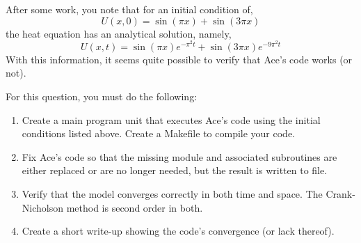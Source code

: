 \documentclass[12pt, letterpaper]{article}
\begin{document}
After some work, you note that for an initial condition of,
\begin{equation}
  U(x,0) = \sin(\pi x) + \sin(3 \pi x)
\end{equation}
the heat equation has an analytical solution, namely,
\begin{equation}
  U(x,t) = \sin(\pi x)e^{-\pi^2t}+\sin(3\pi x)e^{-9\pi^2t}
\end{equation}
With this information, it seems quite possible to verify that Ace's code works
(or not).

For this question, you must do the following:
\begin{enumerate}
  \item Create a main program unit that executes Ace's code using the
    initial conditions listed above.  Create a Makefile to compile your code.
  \item Fix Ace's code so that the missing module and associated subroutines
    are either replaced or are no longer needed, but the result is written 
    to file.
  \item Verify that the model converges correctly in both time and space.
    The Crank-Nicholson method is second order in both.
  \item Create a short write-up showing the code's convergence (or lack thereof).
\end{enumerate}



\end{document}

